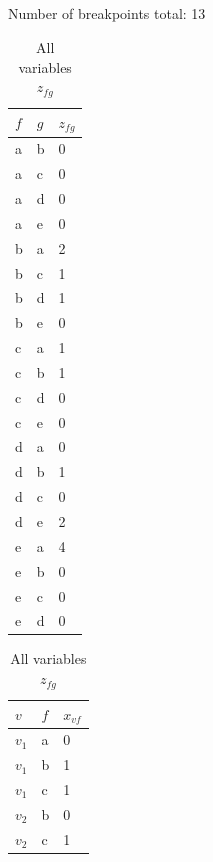 \documentclass[11pt,a4paper,english]{article}
\begin{document}
\subsection{}

Number of breakpoints total: 13

\begin{table}
    \begin{subtable}{0.5\textwidth}
        \centering
        \begin{tabular}{l | l | l}
            $f$ & $g$ & $z_{fg}$ \\ \hline
            a   & b & 0 \\
            a   & c & 0 \\
            a   & d & 0 \\
            a   & e & 0 \\
            b   & a & 2 \\
            b   & c & 1 \\
            b   & d & 1 \\
            b   & e & 0 \\
            c   & a & 1 \\
            c   & b & 1 \\
            c   & d & 0 \\
            c   & e & 0 \\
            d   & a & 0 \\
            d   & b & 1 \\
            d   & c & 0 \\
            d   & e & 2 \\
            e   & a & 4 \\
            e   & b & 0 \\
            e   & c & 0 \\
            e   & d & 0
        \end{tabular}
        \caption{All variables $z_{fg}$}
    \end{subtable}
    \begin{subtable}{0.5\textwidth}
        \centering
        \begin{tabular}{l | l | l}
            $v$ & $f$ & $x_{vf}$ \\ \hline
            $v_1$   & a & 0 \\
            $v_1$   & b & 1\\
            $v_1$   & c & 1 \\
            $v_2$   & b & 0 \\
            $v_2$   & c & 1 \\

\end{tabular}
\end{subtable}
\end{table}
\end{document}
